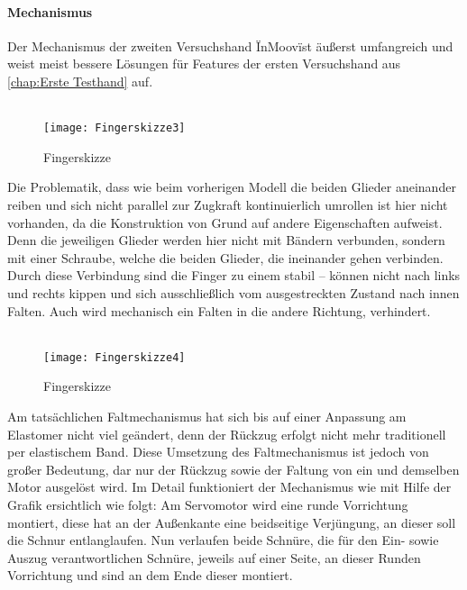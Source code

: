 \documentclass[titlepage,12pt,twoside]{article}
\begin{document}
\paragraph{Mechanismus}
\label{par:Mechanismus_zweite_Hand}
\hfill \break
\hfill \break
Der Mechanismus der zweiten Versuchshand \"InMoov\" ist äußerst umfangreich und weist meist bessere Lösungen für Features der ersten Versuchshand aus \autoref{chap:Erste Testhand} auf. \\
\\
\begin{figure}[H]
	\begin{center}
		\scalebox{1}
		{\texttt{[image: Fingerskizze3]}}
		\caption{Fingerskizze}
		\label{fig:Fingerskizze3}			
	\end{center}
\end{figure}
\hfill \break
Die Problematik, dass wie beim vorherigen Modell die beiden Glieder aneinander reiben und sich nicht parallel zur Zugkraft kontinuierlich umrollen ist hier nicht vorhanden, da die Konstruktion von Grund auf andere Eigenschaften aufweist. 
Denn die jeweiligen Glieder werden hier nicht mit Bändern verbunden, sondern mit einer Schraube, welche die beiden Glieder, die ineinander gehen verbinden. Durch diese Verbindung sind die Finger zu einem stabil – können nicht nach links und 
rechts kippen und sich ausschließlich vom ausgestreckten Zustand nach innen Falten. Auch wird mechanisch ein Falten in die andere Richtung, verhindert. \\
\\
\begin{figure}[H]
	\begin{center}
		\scalebox{1}
		{\texttt{[image: Fingerskizze4]}}
		\caption{Fingerskizze}
		\label{fig:Fingerskizze4}			
	\end{center}
\end{figure}
\hfill \break
Am tatsächlichen Faltmechanismus hat sich bis auf einer Anpassung am Elastomer nicht viel geändert, denn der Rückzug erfolgt nicht mehr traditionell per elastischem Band. Diese Umsetzung des Faltmechanismus ist jedoch von großer Bedeutung, dar 
nur der Rückzug sowie der Faltung von ein und demselben Motor ausgelöst wird. Im Detail funktioniert der Mechanismus wie mit Hilfe der Grafik ersichtlich wie folgt: Am Servomotor wird eine runde Vorrichtung montiert, diese hat an der Außenkante 
eine beidseitige Verjüngung, an dieser soll die Schnur entlanglaufen. Nun verlaufen beide Schnüre, die für den Ein- sowie Auszug verantwortlichen Schnüre, jeweils auf einer Seite, an dieser Runden Vorrichtung und sind an dem Ende dieser montiert. 
\end{document}
